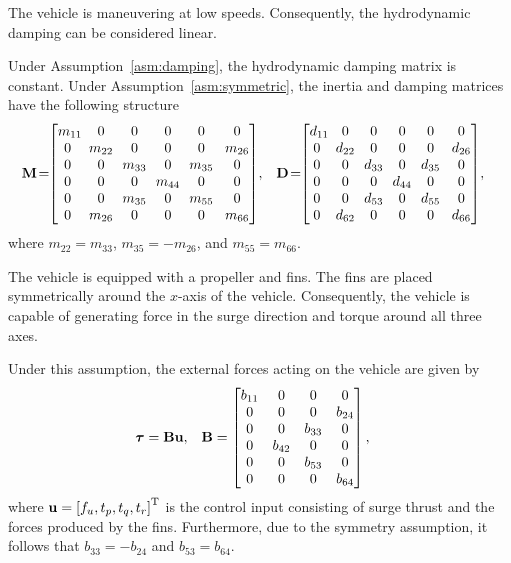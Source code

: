 \begin{asm}
    \label{asm:damping}
    The vehicle is maneuvering at low speeds.
    Consequently, the hydrodynamic damping can be considered linear.
\end{asm}

\noindent Under Assumption~\ref{asm:damping}, the hydrodynamic damping matrix is constant.
Under Assumption~\ref{asm:symmetric}, the inertia and damping matrices have the following structure
\begin{align}
    \mat{M}\! &= \!\!
    \begin{bmatrix}
        m_{11}\!\! & 0 & 0 & 0 & 0 & 0\\ 0 & \!m_{22}\! & 0 & 0 & 0 & m_{26}\\ 0 & 0 & \!m_{33}\! & 0 & \!m_{35}\! & 0\\ 0 & 0 & 0 & \!m_{44}\! & 0 & 0\\ 0 & 0 & \!m_{35}\! & 0 & \!m_{55}\! & 0\\ 0 & \!m_{26}\! & 0 & 0 & 0 & m_{66}
    \end{bmatrix}\!, &
    \mat{D}\! &= \!\!
    \begin{bmatrix}
        d_{11}\!\! & 0 & 0 & 0 & 0 & 0\\ 0 & \!d_{22}\! & 0 & 0 & 0 & d_{26}\\ 0 & 0 & \!d_{33}\! & 0 & \!d_{35}\! & 0\\ 0 & 0 & 0 & \!d_{44}\! & 0 & 0\\ 0 & 0 & \!d_{53}\! & 0 & \!d_{55}\! & 0\\ 0 & \!d_{62}\! & 0 & 0 & 0 & d_{66}
    \end{bmatrix}\!,
\end{align}
where $m_{22} = m_{33}$, $m_{35} = -m_{26}$, and $m_{55} = m_{66}$.

\begin{asm}
    \label{asm:actuators}
    The vehicle is equipped with a propeller and fins.
    The fins are placed symmetrically around the $x$-axis of the vehicle.
    Consequently, the vehicle is capable of generating force in the surge direction and torque around all three axes.
\end{asm}
Under this assumption, the external forces acting on the vehicle are given by
\begin{align}
    \bm{\tau} &= \mathbf{B}\mathbf{u}, &
    \mathbf{B} &= 
    \begin{bmatrix}
        b_{11} & 0 & 0 & 0 \\ 0 & 0 & 0 & b_{24} \\ 0 & 0 & b_{33} & 0 \\ 0 & b_{42} & 0 & 0 \\ 0 & 0 & b_{53} & 0 \\ 0 & 0 & 0 & b_{64}
    \end{bmatrix},
\end{align}
where $\mathbf{u} = \left[f_u, t_p, t_q, t_r\right]^{\mathrm{T}}$ is the control input consisting of surge thrust and the forces produced by the fins.
Furthermore, due to the symmetry assumption, it follows that $b_{33} = -b_{24}$ and $b_{53} = b_{64}$.

